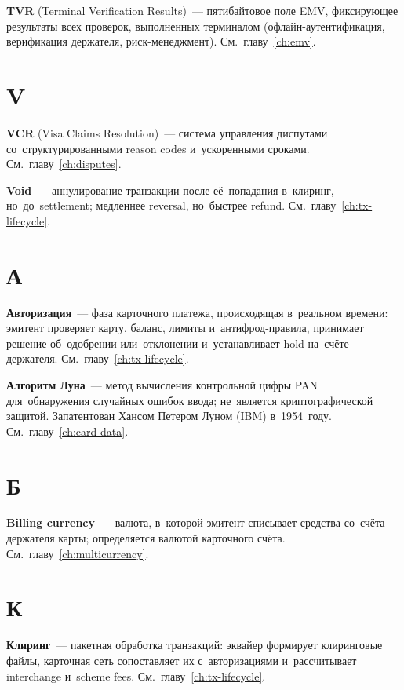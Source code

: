 \textbf{TVR} (Terminal Verification Results)~--- пятибайтовое
поле EMV, фиксирующее результаты всех проверок, выполненных
терминалом (офлайн-аутентификация, верификация держателя,
риск-менеджмент). См.~главу~\ref{ch:emv}.


\section*{V}

\textbf{VCR} (Visa Claims Resolution)~--- система управления
диспутами  со~структурированными reason codes
и~ускоренными
сроками. См.~главу~\ref{ch:disputes}.

\textbf{Void}~--- аннулирование транзакции после её~попадания
в~клиринг, но~до~settlement; медленнее reversal, но~быстрее
refund. См.~главу~\ref{ch:tx-lifecycle}.



\section*{А}

\textbf{Авторизация}~--- фаза карточного платежа, происходящая
в~реальном времени: эмитент проверяет карту, баланс, лимиты
и~антифрод-правила, принимает решение об~одобрении или~отклонении
и~устанавливает hold на~счёте
держателя. См.~главу~\ref{ch:tx-lifecycle}.

\textbf{Алгоритм Луна}~--- метод вычисления контрольной цифры
PAN для~обнаружения случайных ошибок ввода; не~является
криптографической защитой. Запатентован Хансом Петером Луном
(IBM) в~1954~году. См.~главу~\ref{ch:card-data}.


\section*{Б}

\textbf{Billing currency}~--- валюта, в~которой эмитент
списывает средства со~счёта держателя карты; определяется
валютой карточного счёта. См.~главу~\ref{ch:multicurrency}.


\section*{К}

\textbf{Клиринг}~--- пакетная обработка транзакций: эквайер
формирует клиринговые файлы, карточная сеть сопоставляет их
с~авторизациями и~рассчитывает interchange
и~scheme fees. См.~главу~\ref{ch:tx-lifecycle}.

